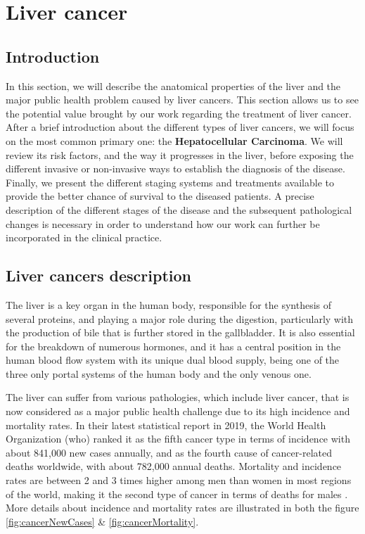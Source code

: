 \chapter{Liver cancer} \label{liverCancer}

\section{Introduction}

In this section, we will describe the anatomical properties of the liver
and the major public health problem caused by liver cancers. This
section allows us to see the potential value brought by our work
regarding the treatment of liver cancer.
After a brief introduction about the different types of liver cancers,
we will focus on the most common primary one: the \textbf{Hepatocellular
Carcinoma}. We will review its risk factors, and the way it progresses in
the liver, before exposing the different invasive or non-invasive ways
to establish the diagnosis of the disease. Finally, we present the
different staging systems and treatments available to provide the better
chance of survival to the diseased patients. A precise description of
the different stages of the disease and the subsequent pathological
changes is necessary in order to understand how our work can further be
incorporated in the clinical practice.

\section{Liver cancers description}\label{liver_cancer_description}

The liver is a key organ in the human body, responsible for the
synthesis of several proteins, and playing a major role during the
digestion, particularly with the production of bile that is further
stored in the gallbladder. It is also essential for the breakdown of
numerous hormones, and it has a central position in the human blood flow
system with its unique dual blood supply, being one of the three only portal
systems of the human body and the only venous one.

The liver can suffer from various pathologies, which
include liver cancer, that is now considered as a major public health
challenge due to its high incidence and mortality rates. In their latest
statistical report in 2019, the World Health Organization (\ac{who}) ranked it as the fifth
cancer type in terms of incidence with about 841,000 new cases annually,
and as the fourth cause of cancer-related deaths worldwide, with about
782,000 annual deaths. Mortality and incidence rates are between 2 and 3
times higher among men than women in most regions of the world, making
it the second type of cancer in terms of deaths for males \cite{F.Bray2018a}. More details about incidence and mortality rates are illustrated in both the figure \ref{fig:cancerNewCases} \& \ref{fig:cancerMortality}. \\

